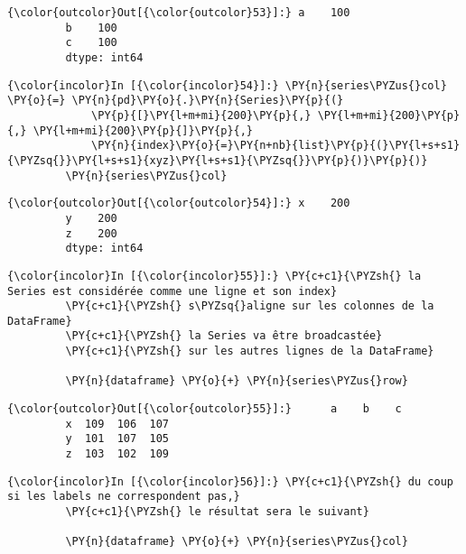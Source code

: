 \begin{Verbatim}[commandchars=\\\{\}]
{\color{outcolor}Out[{\color{outcolor}53}]:} a    100
         b    100
         c    100
         dtype: int64
\end{Verbatim}
            
    \begin{Verbatim}[commandchars=\\\{\}]
{\color{incolor}In [{\color{incolor}54}]:} \PY{n}{series\PYZus{}col} \PY{o}{=} \PY{n}{pd}\PY{o}{.}\PY{n}{Series}\PY{p}{(}
             \PY{p}{[}\PY{l+m+mi}{200}\PY{p}{,} \PY{l+m+mi}{200}\PY{p}{,} \PY{l+m+mi}{200}\PY{p}{]}\PY{p}{,}
             \PY{n}{index}\PY{o}{=}\PY{n+nb}{list}\PY{p}{(}\PY{l+s+s1}{\PYZsq{}}\PY{l+s+s1}{xyz}\PY{l+s+s1}{\PYZsq{}}\PY{p}{)}\PY{p}{)}
         \PY{n}{series\PYZus{}col}
\end{Verbatim}


\begin{Verbatim}[commandchars=\\\{\}]
{\color{outcolor}Out[{\color{outcolor}54}]:} x    200
         y    200
         z    200
         dtype: int64
\end{Verbatim}
            
    \begin{Verbatim}[commandchars=\\\{\}]
{\color{incolor}In [{\color{incolor}55}]:} \PY{c+c1}{\PYZsh{} la Series est considérée comme une ligne et son index}
         \PY{c+c1}{\PYZsh{} s\PYZsq{}aligne sur les colonnes de la DataFrame}
         \PY{c+c1}{\PYZsh{} la Series va être broadcastée}
         \PY{c+c1}{\PYZsh{} sur les autres lignes de la DataFrame}
         
         \PY{n}{dataframe} \PY{o}{+} \PY{n}{series\PYZus{}row}
\end{Verbatim}


\begin{Verbatim}[commandchars=\\\{\}]
{\color{outcolor}Out[{\color{outcolor}55}]:}      a    b    c
         x  109  106  107
         y  101  107  105
         z  103  102  109
\end{Verbatim}
            
    \begin{Verbatim}[commandchars=\\\{\}]
{\color{incolor}In [{\color{incolor}56}]:} \PY{c+c1}{\PYZsh{} du coup si les labels ne correspondent pas,}
         \PY{c+c1}{\PYZsh{} le résultat sera le suivant}
         
         \PY{n}{dataframe} \PY{o}{+} \PY{n}{series\PYZus{}col}
\end{Verbatim}


